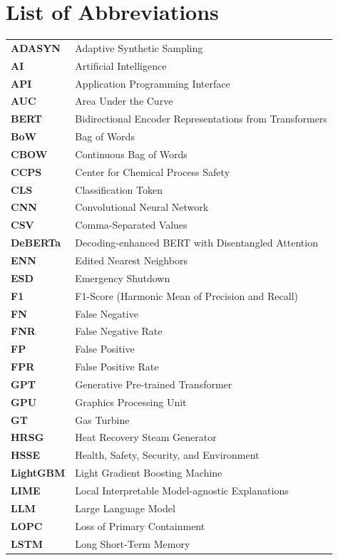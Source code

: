 \documentclass[11pt, titlepage, bibliography=totoc]{scrreprt}
\begin{document}
\chapter*{List of Abbreviations}

\noindent
\begin{tabular}{@{}p{2.5cm}p{12cm}@{}}
\textbf{ADASYN} & Adaptive Synthetic Sampling \\[0.3em]
\textbf{AI} & Artificial Intelligence \\[0.3em]
\textbf{API} & Application Programming Interface \\[0.3em]
\textbf{AUC} & Area Under the Curve \\[0.3em]
\textbf{BERT} & Bidirectional Encoder Representations from Transformers \\[0.3em]
\textbf{BoW} & Bag of Words \\[0.3em]
\textbf{CBOW} & Continuous Bag of Words \\[0.3em]
\textbf{CCPS} & Center for Chemical Process Safety \\[0.3em]
\textbf{CLS} & Classification Token \\[0.3em]
\textbf{CNN} & Convolutional Neural Network \\[0.3em]
\textbf{CSV} & Comma-Separated Values \\[0.3em]
\textbf{DeBERTa} & Decoding-enhanced BERT with Disentangled Attention \\[0.3em]
\textbf{ENN} & Edited Nearest Neighbors \\[0.3em]
\textbf{ESD} & Emergency Shutdown \\[0.3em]
\textbf{F1} & F1-Score (Harmonic Mean of Precision and Recall) \\[0.3em]
\textbf{FN} & False Negative \\[0.3em]
\textbf{FNR} & False Negative Rate \\[0.3em]
\textbf{FP} & False Positive \\[0.3em]
\textbf{FPR} & False Positive Rate \\[0.3em]
\textbf{GPT} & Generative Pre-trained Transformer \\[0.3em]
\textbf{GPU} & Graphics Processing Unit \\[0.3em]
\textbf{GT} & Gas Turbine \\[0.3em]
\textbf{HRSG} & Heat Recovery Steam Generator \\[0.3em]
\textbf{HSSE} & Health, Safety, Security, and Environment \\[0.3em]
\textbf{LightGBM} & Light Gradient Boosting Machine \\[0.3em]
\textbf{LIME} & Local Interpretable Model-agnostic Explanations \\[0.3em]
\textbf{LLM} & Large Language Model \\[0.3em]
\textbf{LOPC} & Loss of Primary Containment \\[0.3em]
\textbf{LSTM} & Long Short-Term Memory \\[0.3em]
\end{tabular}
\end{document}
